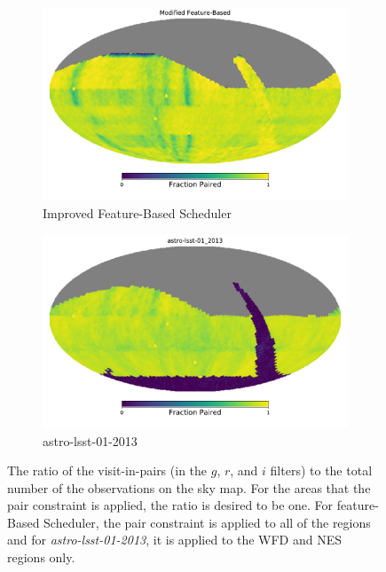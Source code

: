 \documentclass[12pt,aas_macros]{article}
\theoremstyle{definition}
\begin{document}
\begin{figure}[h!]
\begin{subfigure}{.5\textwidth}
  \centering
  \includegraphics[width=.9\linewidth]{FB10yrs_Pair_skymap.pdf}
  \caption{Improved Feature-Based Scheduler}
  \label{fig:sfig1}
\end{subfigure}%
\begin{subfigure}{.5\textwidth}
  \centering
  \includegraphics[width=.9\linewidth]{OpSim10yrs_Pair_skymap.pdf}
  \caption{astro-lsst-01-2013}
  \label{fig:sfig2}
\end{subfigure}
\caption{The ratio of the visit-in-pairs (in the $g$, $r$, and $i$ filters) to the total number of the observations on the sky map. For the areas that the pair constraint is applied, the ratio is desired to be one. For feature-Based Scheduler, the pair constraint is applied to all of the regions and for \textit{astro-lsst-01-2013}, it is applied to the WFD and NES regions only.}
\label{fig_10yrs_pair}
\end{figure}
\end{document}
